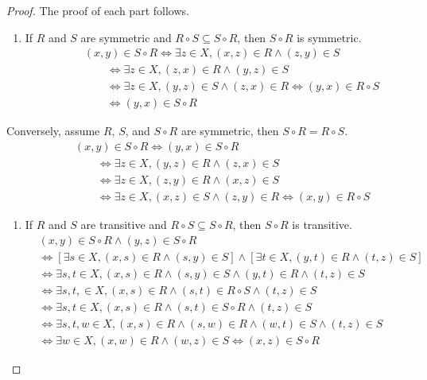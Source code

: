 \documentclass[
  letterpaper,
  10pt,
  reqno,
  twopage,
  openany]{book}
\providecommand{\tightlist}{%
  \setlength{\itemsep}{0pt}\setlength{\parskip}{0pt}}\usepackage{longtable,booktabs,array}
\theoremstyle{plain}
\theoremstyle{definition}
\theoremstyle{definition}
\theoremstyle{definition}
\theoremstyle{plain}
\theoremstyle{plain}
\theoremstyle{remark}
\begin{document}
\begin{proof}

The proof of each part follows.

\begin{enumerate}
\def\labelenumi{\arabic{enumi}.}
\tightlist
\item
  If \(R\) and \(S\) are symmetric and \(R\circ S\subseteq S\circ R\),
  then \(S\circ R\) is symmetric. \begin{align*}
  \qquad  & (x,y)\in S\circ R \Longleftrightarrow \exists z\in X, (x,z)\in R \land (z,y)\in S \\ 
  & \qquad \Longleftrightarrow \exists z\in X, (z,x)\in R \land (y,z)\in S \\ 
  & \qquad \Longleftrightarrow \exists z\in X, (y,z)\in S \land (z,x)\in R \Longleftrightarrow (y,x)\in R\circ S\\ 
  & \qquad \Longleftrightarrow (y,x)\in S\circ R
  \end{align*}
\end{enumerate}

Conversely, assume \(R\), \(S\), and \(S\circ R\) are symmetric, then
\(S\circ R=R\circ S.\) \begin{align*}
\qquad  & (x,y)\in S\circ R \Longleftrightarrow (y,x)\in S\circ R \\ 
& \qquad \Longleftrightarrow \exists z\in X, (y,z)\in R \land (z,x)\in S \\ 
& \qquad \Longleftrightarrow \exists z\in X, (z,y)\in R \land (x,z)\in S \\ 
& \qquad \Longleftrightarrow \exists z\in X, (x,z)\in S \land (z,y)\in R \Longleftrightarrow (x,y)\in R\circ S
\end{align*}

\begin{enumerate}
\def\labelenumi{\arabic{enumi}.}
\setcounter{enumi}{1}
\tightlist
\item
  If \(R\) and \(S\) are transitive and \(R\circ S\subseteq S\circ R\),
  then \(S\circ R\) is transitive. \begin{align*}
  & (x,y)\in S\circ R \land (y,z)\in S\circ R \\ & \Longleftrightarrow [\exists s\in X, (x,s)\in R\land (s,y)\in S] \land [\exists t\in X, (y,t)\in R \land (t,z)\in S] \\ 
  & \Longleftrightarrow \exists s,t\in X, (x,s)\in R \land (s,y)\in S \land (y,t)\in R \land (t,z)\in S \\ 
  & \Longleftrightarrow \exists s,t,\in X, (x,s)\in R \land (s,t)\in R\circ S \land (t,z)\in S  \\ 
  &  \Longleftrightarrow \exists s,t\in X, (x,s)\in R \land (s,t)\in S\circ R \land (t,z)\in S  \\ 
  &  \Longleftrightarrow \exists s,t,w\in X, (x,s)\in R \land (s,w)\in R \land (w,t)\in S \land (t,z)\in S  \\ 
  & \Longleftrightarrow \exists w\in X, (x,w)\in R \land (w,z)\in S \Longleftrightarrow (x,z)\in S\circ R
  \end{align*}
\end{enumerate}


\end{proof}
\end{document}
